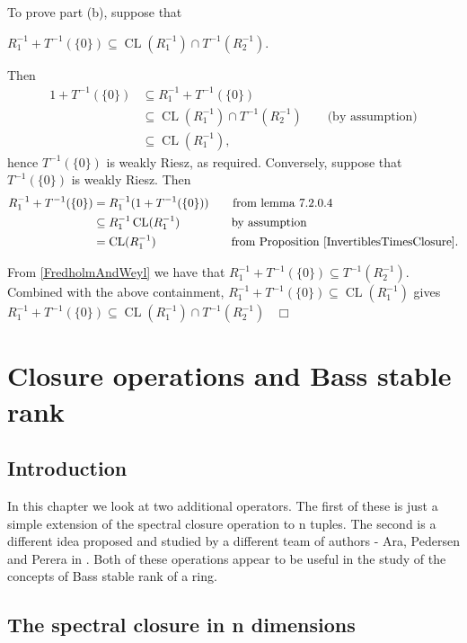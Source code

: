 \documentclass[12pt, oneside]{book}
\newcommand{\qed}{\hfill ~$\Box$\\}
\def\CL{\operatorname{CL}}
\begin{document}
\noindent To prove part (b), suppose that 
\begin{center}
$R_1^{-1}+T^{-1}(\{0\}) \subseteq \CL(R_1^{-1}) \cap T^{-1}(R_2^{-1})$.
\end{center}
Then
\begin{align*}
1+T^{-1}(\{0\}) 
&\subseteq R_1^{-1}+T^{-1}(\{0\})\\
&\subseteq \CL(R_1^{-1}) \cap T^{-1}(R_2^{-1}) \qquad \text{(by assumption)}\\
&\subseteq \CL(R_1^{-1}),
\end{align*}
hence $T^{-1}(\{0\})$ is weakly Riesz, as required.
\vskip 0.3cm
\noindent Conversely, suppose that $T^{-1}(\{0\})$ is weakly Riesz. Then
\begin{align*}
R_1^{-1}+T^{-1}(\{0\})
&= R_1^{-1}(1+T^{-1}(\{0\})) \qquad \text{from lemma 7.2.0.4}\\
&\subseteq R_1^{-1} \CL(R_1^{-1}) \ \qquad \qquad \text{by assumption}\\
&= \CL(R_1^{-1}) \qquad \qquad \qquad \ \text{from Proposition \ref{InvertiblesTimesClosure}.}
\end{align*}

\medskip \noindent From \eqref{FredholmAndWeyl} we have that 
$R_1^{-1}+T^{-1}(\{0\}) \subseteq T^{-1}(R_2^{-1})$. Combined with the above containment, 
$R_1^{-1}+T^{-1}(\{0\}) \subseteq \CL(R_1^{-1})$ 
gives $R_1^{-1}+T^{-1}(\{0\}) \subseteq \CL(R_1^{-1}) \cap T^{-1}(R_2^{-1})$ \qed
\vskip 2cm
\begin{center}
\maltese
\end{center}

\chapter{Closure operations and Bass stable rank} \label{chapter 8}

\section{Introduction}

In this chapter we look at two additional operators. The first of these is just a simple extension 
of the spectral closure operation to n tuples. 
The second is a different idea proposed and studied by a different team of authors - 
Ara, Pedersen and Perera in \cite{APP1, APP2}. Both of these operations appear to be useful in the 
study of the concepts of Bass stable rank of a ring. 

\section{The spectral closure in n dimensions}
\end{document}
